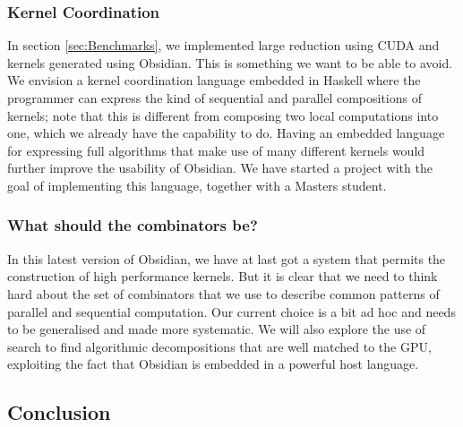 \subsubsection{Kernel Coordination} 

In section \ref{sec:Benchmarks}, we implemented large reduction using 
CUDA and kernels generated using Obsidian. This is something we want to 
be able to avoid. We envision a kernel coordination language embedded 
in Haskell where the programmer can express the kind of sequential 
and parallel compositions of kernels; note that this is different from 
composing two local computations into one, which we already have the 
capability to do. Having an embedded language for expressing full 
algorithms that make use of many different kernels would further 
improve the usability of Obsidian. We have started a project with the 
goal of implementing this language, together with a Masters student. 


\subsubsection{What should the combinators be?}
In this latest version of Obsidian, we have at last got a system
that permits the construction of high performance kernels. But it is
clear that we need to think hard about the set of combinators that
we use to describe common patterns of parallel and sequential computation.
Our current choice is a bit ad hoc and needs to be generalised and made
more systematic. We will also explore the use of search to find algorithmic 
decompositions that are well matched to the GPU, exploiting the fact 
that Obsidian is embedded in a powerful host language.

\subsection{Conclusion}

